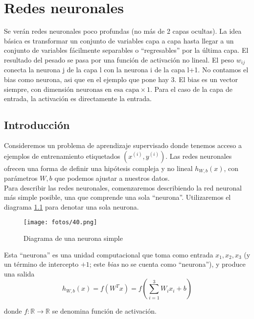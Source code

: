 \chapter{Redes neuronales}\label{Chapter7} 

Se verán redes neuronales poco profundas (no más de 2 capas ocultas). La idea básica es transformar un conjunto de variables capa a capa hasta llegar a un conjunto de variables fácilmente separables o ``regresables'' por la última capa. El resultado del pesado se pasa por una función de activación no lineal. El peso $w_{ij}$ conecta la neurona j de la capa l con la neurona i de la capa l+1. No contamos el bias como neurona, asi que en el ejemplo que pone hay 3. El bias es un vector siempre, con dimensión $\text{neuronas en esa capa} \times 1$. Para el caso de la capa de entrada, la activación es directamente la entrada. 

\section{Introducción}

Consideremos un problema de aprendizaje supervisado donde tenemos acceso a ejemplos de entrenamiento etiquetados $(x^{(i)}, y^{(i)})$. Las redes neuronales ofrecen una forma de definir una hipótesis compleja y no lineal $h_{W,b}(x)$, con parámetros $W, b$ que podemos ajustar a nuestros datos. \\

Para describir las redes neuronales, comenzaremos describiendo la red neuronal más simple posible, una que comprende una sola ``neurona''. Utilizaremos el diagrama \ref{fig:7.1} para denotar una sola neurona.

\begin{figure}[H]
\centering
\texttt{[image: fotos/40.png]}
\caption{Diagrama de una neurona simple}
\label{fig:7.1}
\end{figure}

Esta ``neurona'' es una unidad computacional que toma como entrada $x_1, x_2, x_3$ (y un término de intercepto $+1$; este \textit{bias} no se cuenta como ``neurona''), y produce una salida 
\begin{equation}
h_{W,b}(x) = f(W^T x) = f\left(\sum_{i=1}^{3} W_i x_i + b\right)
\end{equation}

\noindent donde $f: \mathbb{R} \rightarrow \mathbb{R}$ se denomina función de activación. 


